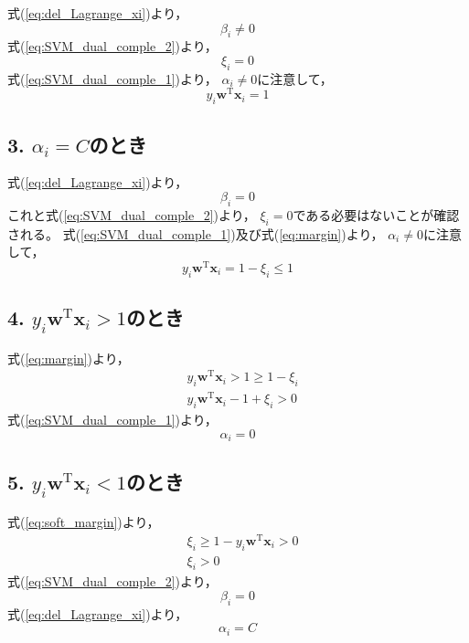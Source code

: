 \documentclass[class=jsarticle, crop=false, dvipdfmx, fleqn]{standalone}
\begin{document}
式(\ref{eq:del_Lagrange_xi})より，
\begin{equation*}
    \beta_i \neq 0
\end{equation*}
式(\ref{eq:SVM_dual_comple_2})より，
\begin{equation*}
    \xi_i = 0
\end{equation*}
式(\ref{eq:SVM_dual_comple_1})より，
\(\alpha_i \neq 0\)に注意して，
\begin{equation}
    y_i \bm{w}^\mathrm{T}\bm{x}_i = 1
\end{equation}



\subsection*{3. \(\alpha_i = C\)のとき}

式(\ref{eq:del_Lagrange_xi})より，
\begin{equation*}
    \beta_i = 0
\end{equation*}
これと式(\ref{eq:SVM_dual_comple_2})より，
\(\xi_i = 0\)である必要はないことが確認される。
式(\ref{eq:SVM_dual_comple_1})及び式(\ref{eq:margin})より，
\(\alpha_i \neq 0\)に注意して，
\begin{equation}
    y_i \bm{w}^\mathrm{T}\bm{x}_i = 1 - \xi_i \le 1
\end{equation}



\subsection*{4. \(y_i \bm{w}^\mathrm{T}\bm{x}_i > 1\)のとき}

式(\ref{eq:margin})より，
\begin{align*}
    & y_i \bm{w}^\mathrm{T}\bm{x}_i > 1 \ge 1 - \xi_i \\
    & y_i \bm{w}^\mathrm{T}\bm{x}_i - 1 + \xi_i > 0
\end{align*}
式(\ref{eq:SVM_dual_comple_1})より，
\begin{equation}
    \alpha_i = 0
\end{equation}



\subsection*{5. \(y_i \bm{w}^\mathrm{T}\bm{x}_i < 1\)のとき}

式(\ref{eq:soft_margin})より，
\begin{align*}
    & \xi_i \ge 1 - y_i \bm{w}^\mathrm{T}\bm{x}_i > 0 \\
    & \xi_i > 0
\end{align*}
式(\ref{eq:SVM_dual_comple_2})より，
\begin{equation*}
    \beta_i = 0
\end{equation*}
式(\ref{eq:del_Lagrange_xi})より，
\begin{equation}
    \alpha_i = C
\end{equation}
\end{document}

